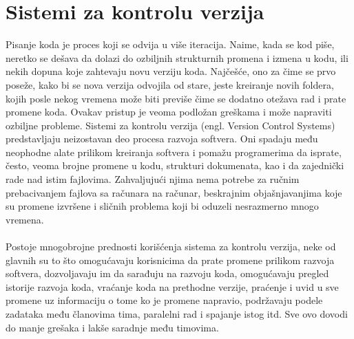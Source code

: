 \section{Sistemi za kontrolu verzija}

Pisanje koda je proces koji se odvija u više iteracija. Naime, kada se kod piše, neretko se dešava da dolazi do ozbiljnih strukturnih promena i izmena u kodu, ili nekih dopuna koje zahtevaju novu verziju koda. Najčešće, ono za čime se prvo poseže, kako bi se nova verzija odvojila od stare, jeste  kreiranje novih foldera, kojih posle nekog vremena može biti previše čime se dodatno otežava rad i prate promene koda. Ovakav pristup je veoma podložan greškama i može napraviti ozbiljne probleme.
Sistemi za kontrolu verzija (engl. Version Control Systems) predstavljaju neizostavan deo procesa razvoja softvera. Oni spadaju među neophodne alate prilikom kreiranja softvera i pomažu programerima da isprate, često, veoma brojne promene u kodu, strukturi dokumenata, kao i da zajednički rade nad istim fajlovima. Zahvaljujući njima nema potrebe za ručnim prebacivanjem fajlova sa računara na računar, beskrajnim objašnjavanjima koje su promene izvršene i sličnih problema koji bi oduzeli nesrazmerno mnogo vremena.\\\\
Postoje mnogobrojne prednosti korišćenja sistema za kontrolu verzija, neke od glavnih su to što omogućavaju korisnicima da prate promene prilikom razvoja softvera, dozvoljavaju im da sarađuju na razvoju koda, omogućavaju pregled istorije razvoja koda, vraćanje koda na prethodne verzije, praćenje i uvid u sve promene uz informaciju o tome ko je promene napravio, podržavaju podele zadataka među članovima tima, paralelni rad i spajanje istog itd. Sve ovo dovodi do manje grešaka i lakše saradnje među timovima.\\\\

